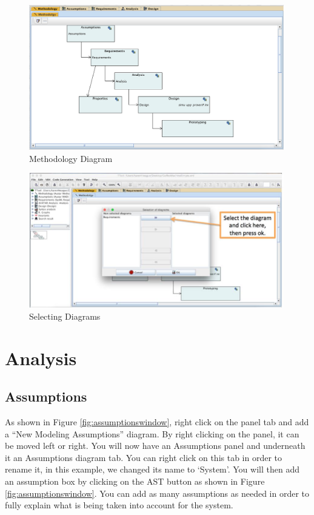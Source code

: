 \documentclass[12pt]{article}
\begin{document}
\begin{figure}[htbp]
\centering
\includegraphics[width=0.99\textwidth]{fig/methoddiagram.png}
\caption{Methodology Diagram} \label{fig:methoddiagram}
\end{figure}


\begin{figure}[htbp]
\centering
\includegraphics[width=0.99\textwidth]{fig/selectdiagram.jpg}
\caption{Selecting Diagrams} \label{fig:selectdiagram}
\end{figure}


\section{Analysis}
\subsection{Assumptions}

As shown in Figure \ref{fig:assumptionswindow}, right click on the panel tab and add a “New Modeling Assumptions” diagram. By right clicking on the panel, it can be moved left or right. You will now have an Assumptions panel and underneath it an Assumptions diagram tab. You can right click on this tab in order to rename it, in this example, we changed its name to ‘System’. You will then add an assumption box by clicking on the AST button as shown in Figure \ref{fig:assumptionswindow}. You can add as many assumptions as needed in order to fully explain what is being taken into account for the system. 
\end{document}
